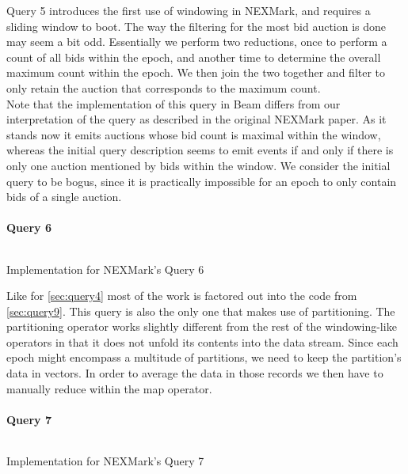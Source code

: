Query 5 introduces the first use of windowing in NEXMark, and requires a sliding window to boot. The way the filtering for the most bid auction is done may seem a bit odd. Essentially we perform two reductions, once to perform a count of all bids within the epoch, and another time to determine the overall maximum count within the epoch. We then join the two together and filter to only retain the auction that corresponds to the maximum count. \\

Note that the implementation of this query in Beam differs from our interpretation of the query as described in the original NEXMark paper. As it stands now it emits auctions whose bid count is maximal within the window, whereas the initial query description seems to emit events if and only if there is only one auction mentioned by bids within the window. We consider the initial query to be bogus, since it is practically impossible for an epoch to only contain bids of a single auction.

\paragraph{Query 6}
\begin{listing}[H]
  \inputminted[firstline=596,lastline=598]{rust}{benchmarks/src/nexmark.rs}
  \caption{Implementation for NEXMark's Query 6}
  \label{lst:nexmark-query6}
\end{listing}

Like for \autoref{sec:query4} most of the work is factored out into the code from \autoref{sec:query9}. This query is also the only one that makes use of partitioning. The partitioning operator works slightly different from the rest of the windowing-like operators in that it does not unfold its contents into the data stream. Since each epoch might encompass a multitude of partitions, we need to keep the partition's data in vectors. In order to average the data in those records we then have to manually reduce within the map operator.

\paragraph{Query 7}
\begin{listing}[H]
  \inputminted[firstline=631,lastline=637]{rust}{benchmarks/src/nexmark.rs}
  \caption{Implementation for NEXMark's Query 7}
  \label{lst:nexmark-query7}
\end{listing}

